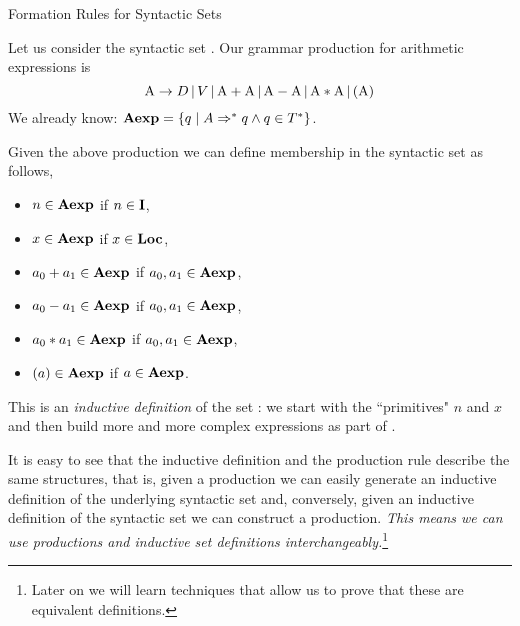 \documentclass{beamer}
\begin{document}
\begin{frame}{Formation Rules for Syntactic Sets}
\scriptsize

Let us consider the syntactic set .  Our grammar production for arithmetic expressions is
\[
\mbox{A} \rightarrow D \,|\, V \,|\, \mbox{A} +\mbox{A} \,|\, \mbox{A} - \mbox{A} \,|\,
	\mbox{A} * \mbox{A}\,|\, ( \mbox{A} )
\]
We already know: $\mbox{\bf Aexp} = \{ q \mid A \Rightarrow^* q \wedge q \in T^*\}$.

\vspace{.1in}
Given the above production we can define membership in the syntactic set as follows,
\begin{minipage}[t]{2in}
\begin{itemize}
\item $n \in  \mbox{\bf Aexp}$ if $n \in \mbox{\bf I}$,
\item $x \in \mbox{\bf Aexp}$ if $x\in \mbox{\bf Loc}$,
\item $a_0 + a_1 \in \mbox{\bf Aexp}$ if $a_0, a_1 \in \mbox{\bf Aexp}$,
\end{itemize}
\end{minipage}
\begin{minipage}[t]{2in}
\begin{itemize}
\item $a_0 - a_1 \in \mbox{\bf Aexp}$ if $a_0, a_1 \in \mbox{\bf Aexp}$,
\item $a_0 * a_1 \in \mbox{\bf Aexp}$ if $a_0, a_1 \in \mbox{\bf Aexp}$,
\item $( a )\in \mbox{\bf Aexp}$ if $a \in \mbox{\bf Aexp}$.
\end{itemize}
\end{minipage}

\vspace{.1in}

This is an {\em inductive definition} of the set : we start with the ``primitives" $n$ and
$x$ and then build more and more complex expressions as part of .

\vspace{.1in}

It is easy to see that the inductive definition and the production rule describe the same structures, that is,
given a production we can easily generate an inductive definition of the underlying syntactic set and, conversely, given an inductive definition of the syntactic set we can construct a production.
{\em This means we can use productions and inductive set definitions interchangeably.}\footnote{\tiny Later on we will learn techniques that allow us to prove that these are equivalent definitions.}

\end{frame}
\end{document}

